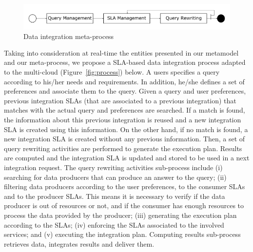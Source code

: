\begin{figure}[h!]
\center
\includegraphics[scale=0.50]{meta-process.png}
\caption{Data integration meta-process}\label{fig:metaprocess}
\end{figure}

Taking into consideration at real-time the entities presented in our metamodel and our meta-process, we propose a SLA-based data integration process adapted to the multi-cloud (Figure~\ref{fig:process}) below.
%
A users specifies a query according to his/her needs and requirements. In addition, he/she defines a set of preferences and associate them to the query. Given a query and user preferences, previous integration SLAs (that are associated to a previous integration) that matches with the actual query and preferences are searched. If a match is found, the information about this previous integration is reused and a new integration SLA is created using this information. On the other hand, if no match is found, a new integration SLA is created without any previous information. Then, a set of query rewriting activities are performed to generate the execution plan. Results are computed and the integration SLA is updated and stored to be used in a next integration request. The query rewriting activities sub-process include (i) searching for data producers that can produce an answer to the query;  (ii) filtering data producers according to the user preferences, to the consumer SLAs and to the producer SLAs. This means it is necessary to verify if the data producer is out of resources or not, and if the consumer has enough resources to process the data provided by the producer; (iii) generating the execution plan according to the SLAs; (iv) enforcing the SLAs associated to the involved services; and (v) executing the integration plan. Computing results sub-process retrieves data, integrates results and deliver them.
%

